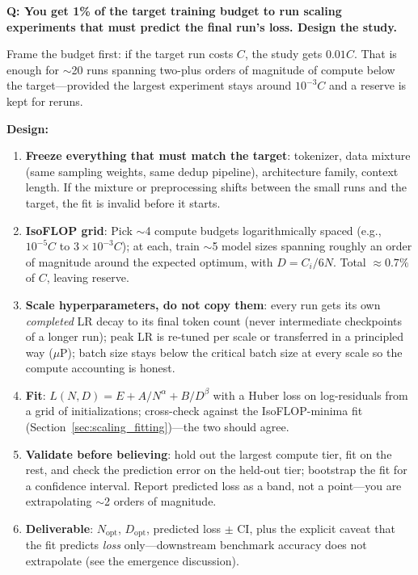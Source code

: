 \begin{interviewq}
\textbf{Q: You get 1\% of the target training budget to run scaling experiments that must predict the final run's loss. Design the study.}

 \quad {} \quad \badgefreq{\freqmed}

\stronganswer
Frame the budget first: if the target run costs $C$, the study gets $0.01C$. That is enough for $\sim$20 runs spanning two-plus orders of magnitude of compute below the target---provided the largest experiment stays around $10^{-3}C$ and a reserve is kept for reruns.

\textbf{Design:}
\begin{enumerate}
    \item \textbf{Freeze everything that must match the target}: tokenizer, data mixture (same sampling weights, same dedup pipeline), architecture family, context length. If the mixture or preprocessing shifts between the small runs and the target, the fit is invalid before it starts.
    \item \textbf{IsoFLOP grid}: Pick $\sim$4 compute budgets logarithmically spaced (e.g., $10^{-5}C$ to $3 \times 10^{-3}C$); at each, train $\sim$5 model sizes spanning roughly an order of magnitude around the expected optimum, with $D = C_i/6N$. Total $\approx 0.7\%$ of $C$, leaving reserve.
    \item \textbf{Scale hyperparameters, do not copy them}: every run gets its own \textit{completed} LR decay to its final token count (never intermediate checkpoints of a longer run); peak LR is re-tuned per scale or transferred in a principled way ($\mu$P); batch size stays below the critical batch size at every scale so the compute accounting is honest.
    \item \textbf{Fit}: $L(N,D) = E + A/N^{\alpha} + B/D^{\beta}$ with a Huber loss on log-residuals from a grid of initializations; cross-check against the IsoFLOP-minima fit (Section~\ref{sec:scaling_fitting})---the two should agree.
    \item \textbf{Validate before believing}: hold out the largest compute tier, fit on the rest, and check the prediction error on the held-out tier; bootstrap the fit for a confidence interval. Report predicted loss as a band, not a point---you are extrapolating $\sim$2 orders of magnitude.
    \item \textbf{Deliverable}: $N_{\text{opt}}$, $D_{\text{opt}}$, predicted loss $\pm$ CI, plus the explicit caveat that the fit predicts \textit{loss} only---downstream benchmark accuracy does not extrapolate (see the emergence discussion).
\end{enumerate}


\end{interviewq}
